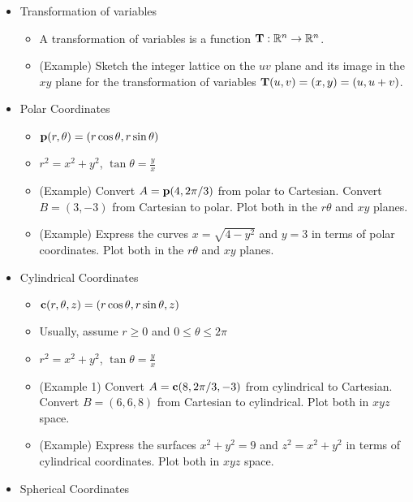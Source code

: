 \documentclass[11pt]{article}
\begin{document}
\begin{itemize}
  \item Transformation of variables
    \begin{itemize}
      \item A transformation of variables is a function
            \(\mathbf{T}:\mathbb R^n\to\mathbb R^n\).
      \item (Example) Sketch the integer lattice on the \(uv\) plane and
            its image in the \(xy\) plane for
            the transformation of variables \(\mathbf{T}(u,v)=(x,y)=(u,u+v)\).
    \end{itemize}
  \item Polar Coordinates
    \begin{itemize}
      \item \(\mathbf{p}(r,\theta)=(r\cos\theta,r\sin\theta)\)
      \item \(r^2=x^2+y^2\), \(\tan\theta=\frac{y}{x}\)
      \item (Example)
            Convert \(A=\mathbf{p}(4,2\pi/3)\) from polar to Cartesian.
            Convert \(B=(3,-3)\) from Cartesian to polar. Plot both in
            the \(r\theta\) and \(xy\) planes.
      \item (Example)
            Express the curves \(x=\sqrt{4-y^2}\) and \(y=3\) in terms
            of polar coordinates. Plot both in the \(r\theta\) and \(xy\)
            planes.
    \end{itemize}
  \item Cylindrical Coordinates
    \begin{itemize}
      \item \(\mathbf{c}(r,\theta,z)=(r\cos\theta,r\sin\theta,z)\)
      \item Usually, assume \(r\geq0\) and \(0\leq\theta\leq2\pi\)
      \item \(r^2=x^2+y^2\), \(\tan\theta=\frac{y}{x}\)
      \item (Example 1) Convert \(A=\mathbf{c}(8,2\pi/3,-3)\) from cylindrical to
            Cartesian. Convert \(B=(6,6,8)\) from Cartesian to cylindrical.
            Plot both in \(xyz\) space.
      \item (Example) Express the surfaces \(x^2+y^2=9\) and \(z^2=x^2+y^2\)
            in terms of cylindrical coordinates. Plot both in \(xyz\) space.
    \end{itemize}
  \item Spherical Coordinates
\end{itemize}
\end{document}
